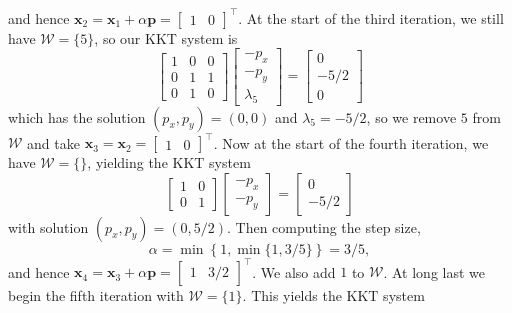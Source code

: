 \documentclass{../kin_math}
\begin{document}
\begin{questions}
\begin{enumerate}
\begin{solution}
      and hence $\textbf{x}_2 = \textbf{x}_1 + \alpha \textbf{p} = \begin{bmatrix} 1 & 0 \end{bmatrix}^\top$. At the start of the third iteration, we still have $\mathcal{W} = \{5\}$, so our KKT system is
      \begin{equation*}
        \begin{bmatrix} 1 & 0 & 0 \\ 0 & 1 & 1 \\ 0 & 1 & 0 \end{bmatrix} \begin{bmatrix} -p_x \\ -p_y \\ \lambda_5 \end{bmatrix} = \begin{bmatrix} 0 \\ -5 / 2 \\ 0 \end{bmatrix}
      \end{equation*}
      which has the solution $(p_x, p_y) = (0, 0)$ and $\lambda_5 = -5 / 2$, so we remove $5$ from $\mathcal{W}$ and take $\textbf{x}_3 = \textbf{x}_2 = \begin{bmatrix} 1 & 0 \end{bmatrix}^\top$. Now at the start of the fourth iteration, we have $\mathcal{W} = \{\}$, yielding the KKT system
      \begin{equation*}
        \begin{bmatrix} 1 & 0 \\ 0 & 1 \end{bmatrix} \begin{bmatrix} -p_x \\ -p_y \end{bmatrix} = \begin{bmatrix} 0 \\ -5 / 2 \end{bmatrix}
      \end{equation*}
      with solution $(p_x, p_y) = (0, 5 / 2)$. Then computing the step size,
      \begin{equation*}
        \alpha = \min\left\{1, \min\{1, 3 / 5\} \right\} = 3 / 5,
      \end{equation*}
      and hence $\textbf{x}_4 = \textbf{x}_3 + \alpha \textbf{p} = \begin{bmatrix} 1 & 3 / 2 \end{bmatrix}^\top$. We also add $1$ to $\mathcal{W}$. At long last we begin the fifth iteration with $\mathcal{W} = \{1\}$. This yields the KKT system

\end{solution}
\end{enumerate}
\end{questions}
\end{document}
